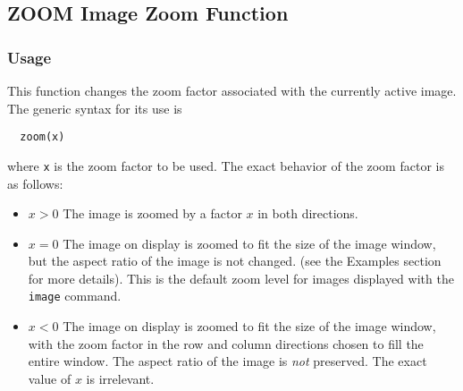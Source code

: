 %
%
%
\subsection{ZOOM Image Zoom Function}
\subsubsection{Usage}
This function changes the zoom factor associated with the currently active
image.  The generic syntax for its use is
\begin{verbatim}
  zoom(x)
\end{verbatim}
where \verb|x| is the zoom factor to be used.  The exact behavior of the zoom
factor is as follows:
\begin{itemize}
\item $x>0$ The image is zoomed by a factor $x$ in both directions.
\item $x=0$ The image on display is zoomed to fit the size of the image window, but
  the aspect ratio of the image is not changed.  (see the Examples section for
more details).  This is the default zoom level for images displayed with the
\verb|image| command.
\item $x<0$ The image on display is zoomed to fit the size of the image window, with
  the zoom factor in the row and column directions chosen to fill the entire window.
  The aspect ratio of the image is \emph{not} preserved.  The exact value of $x$ is
  irrelevant.
\end{itemize}
